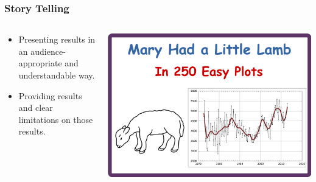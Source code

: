 \begin{frame}
\frametitle{Story Telling}

\begin{center}


\begin{columns}

\begin{column}{0.5\textwidth}
\begin{center}
\begin{itemize}
\item Presenting results in an audience-appropriate and understandable way.
\item Providing results and clear limitations on those results.
\end{itemize}
\end{center}
\end{column}

\begin{column}{0.5\textwidth}
\includegraphics[width=1.0\textwidth]{graphics/mary_had.pdf}
\end{column}

\end{columns}

\end{center}

\end{frame}

